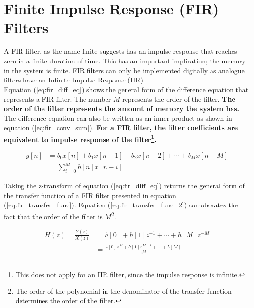 \documentclass{article}
\begin{document}
\section{Finite Impulse Response (FIR) Filters}\label{sec:FIR_theory}
A FIR filter, as the name finite suggests has an impulse response that reaches zero in a finite duration of time. This has an important implication; the memory in the system is finite. FIR filters can only be implemented digitally as analogue filters have an Infinite Impulse Response (IIR).\\ 

Equation (\ref{eq:fir_diff_eq}) shows the general form of the difference equation that represents a FIR filter. The number $M$ represents the order of the filter. \textbf{The order of the filter represents the amount of memory the system has.}\\

The difference equation can also be written as an inner product as shown in equation (\ref{eq:fir_conv_sum}).\textbf{ For a FIR filter, the filter coefficients are equivalent to impulse response of the filter\footnote{This does not apply for an IIR filter, since the impulse response is infinite.}.}

\begin{align}
    y[n]    &= b_{0}x[n] + b_{1}x[n-1] +  b_{2}x[n-2] + \cdots + b_{M}x[n-M]\label{eq:fir_diff_eq}\\ 
            &= \sum_{i=0}^{M}h[n]x[n-i]\label{eq:fir_conv_sum}
\end{align}

Taking the z-transform of equation (\ref{eq:fir_diff_eq}) returns the general form of the transfer function of a FIR filter presented in equation (\ref{eq:fir_transfer_func}). Equation (\ref{eq:fir_transfer_func_2}) corroborates the fact that the order of the filter is $M$\footnote{The order of the polynomial in the denominator of the transfer function determines the order of the filter.}. 


\begin{align}
    H(z) = \frac{Y(z)}{X(z)}    &= h[0] + h[1]z^{-1} + \cdots + h[M]z^{-M}\label{eq:fir_transfer_func}\\ 
                                &= \frac{h[0]z^{M} + h[1]z^{M-1} + \cdots + h[M]}{z^M} \label{eq:fir_transfer_func_2}
\end{align}
\end{document}
